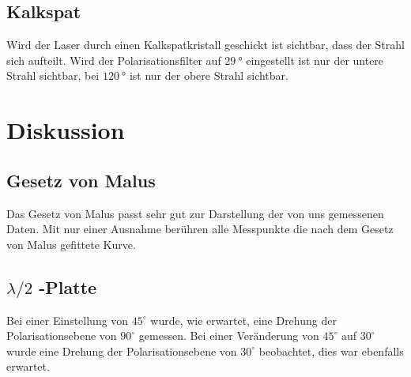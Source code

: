 %
\subsection{Kalkspat}
Wird der Laser durch einen Kalkspatkristall geschickt ist sichtbar, dass der Strahl sich aufteilt. Wird der Polarisationsfilter auf $ \SI{29}{\degree} $ eingestellt ist nur der untere Strahl sichtbar, bei $ \SI{120}{\degree} $ ist nur der obere Strahl sichtbar. 

\newpage
\section{Diskussion} 
\subsection{Gesetz von Malus}
Das Gesetz von Malus passt sehr gut zur Darstellung der von uns gemessenen Daten. Mit nur einer Ausnahme berühren alle Messpunkte die nach dem Gesetz von Malus gefittete Kurve. 

\subsection{$ \lambda /2 $ -Platte}
Bei einer Einstellung von $ 45^\circ $ wurde, wie erwartet, eine Drehung der Polarisationsebene von $ 90^\circ $ gemessen.
Bei einer Veränderung von $ 45^\circ $ auf $ 30^\circ $ wurde eine Drehung der Polarisationsebene von $ 30^\circ $ beobachtet, dies war ebenfalls erwartet.

